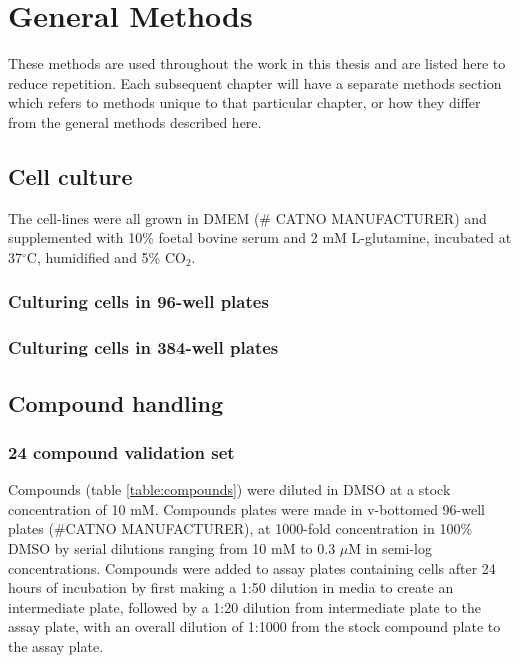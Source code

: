 \documentclass[a4paper,11pt,twoside,openright]{scrbook}
\begin{document}
\chapter{General Methods} \label{chapter:generalMethods}

These methods are used throughout the work in this thesis and are listed here to reduce repetition.
Each subsequent chapter will have a separate methods section which refers to methods unique to that particular chapter, or how they differ from the general methods described here.


\section{Cell culture}
The cell-lines were all grown in DMEM (\# CATNO MANUFACTURER) and supplemented with 10\% foetal bovine serum and 2 mM L-glutamine, incubated at 37$^\circ$C, humidified and 5\% CO$_2$.

\subsection{Culturing cells in 96-well plates}

\subsection{Culturing cells in 384-well plates}


\section{Compound handling}

\subsection{24 compound validation set}

Compounds (table \ref{table:compounds}) were diluted in DMSO at a stock concentration of 10 mM.
Compounds plates were made in v-bottomed 96-well plates (\#CATNO MANUFACTURER), at 1000-fold concentration in 100\% DMSO by serial dilutions ranging from 10 mM to 0.3 $\mu$M in semi-log concentrations.
Compounds were added to assay plates containing cells after 24 hours of incubation by first making a 1:50 dilution in media to create an intermediate plate, followed by a 1:20 dilution from intermediate plate to the assay plate, with an overall dilution of 1:1000 from the stock compound plate to the assay plate.
\end{document}
